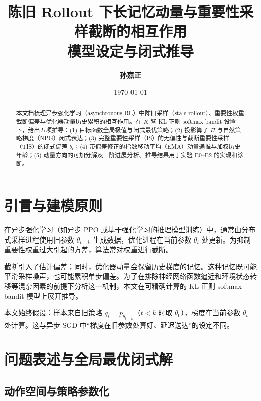 \documentclass[11pt, a4paper, UTF8]{ctexart}
\title{\LARGE\bfseries 陈旧 Rollout 下长记忆动量与重要性采样截断的相互作用\\ \vspace{0.4em}\Large 模型设定与闭式推导}
\author{\textbf{孙嘉正}}
\date{\today}
\begin{document}
\maketitle

\begin{abstract}
\noindent 本文档梳理异步强化学习（asynchronous RL）中陈旧采样（stale rollout）、重要性权重截断偏差与优化器动量历史累积的相互作用。在 $K$ 臂 KL 正则 softmax bandit 设置下，给出五项推导：(1) 目标函数全局极值与闭式最优策略；(2) 投影算子 $\Pi$ 与自然策略梯度（NPG）闭式表达；(3) 完整重要性采样（IS）的无偏性与截断重要性采样（TIS）的闭式偏差 $b_t$；(4) 带偏差修正的指数移动平均（EMA）动量递推与加权历史年龄；(5) 动量方向的可加分解及一阶进展分析。推导结果用于实验 E0--E2 的实现和诊断。
\end{abstract}

\newpage
\tableofcontents
\newpage

\section{引言与建模原则}

在异步强化学习（如异步 PPO 或基于强化学习的推理模型训练）中，通常由分布式采样进程使用旧参数 $\theta_{t-k}$ 生成数据，优化进程在当前参数 $\theta_t$ 处更新。为抑制重要性权重过大引起的方差，算法常对权重进行截断。

截断引入了估计偏差；同时，优化器动量会保留历史梯度的记忆。这种记忆既可能平滑采样噪声，也可能累积单步偏差。为了在排除神经网络函数逼近和环境状态转移等混杂因素的前提下分析这一机制，本文在可精确计算的 KL 正则 softmax bandit 模型上展开推导。

\begin{warningbox}[建模约定]
本文始终假设：样本来自旧策略 $q_t = p_{\theta_{t-k}}$（$t < k$ 时取 $\theta_0$），梯度在当前参数 $\theta_t$ 处计算。这与异步 SGD 中“梯度在旧参数处算好、延迟送达”的设定不同。
\end{warningbox}

\section{问题表述与全局最优闭式解}

\subsection{动作空间与策略参数化}
\end{document}
